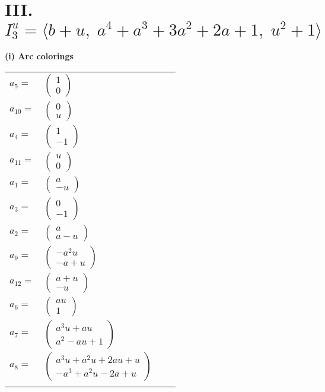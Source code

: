 \documentclass[1p]{elsarticle_modified}
\theoremstyle{definition}
\begin{document}
\centering \section*{III. $I^u_{3}= \langle b+u,\;a^4+a^3+3 a^2+2 a+1,\;u^2+1 \rangle$}
\flushleft \textbf{(i) Arc colorings}\\
\begin{tabular}{m{7pt} m{180pt} m{7pt} m{180pt} }
\flushright $a_{5}=$&$\begin{pmatrix}1\\0\end{pmatrix}$ \\
\flushright $a_{10}=$&$\begin{pmatrix}0\\u\end{pmatrix}$ \\
\flushright $a_{4}=$&$\begin{pmatrix}1\\-1\end{pmatrix}$ \\
\flushright $a_{11}=$&$\begin{pmatrix}u\\0\end{pmatrix}$ \\
\flushright $a_{1}=$&$\begin{pmatrix}a\\- u\end{pmatrix}$ \\
\flushright $a_{3}=$&$\begin{pmatrix}0\\-1\end{pmatrix}$ \\
\flushright $a_{2}=$&$\begin{pmatrix}a\\a- u\end{pmatrix}$ \\
\flushright $a_{9}=$&$\begin{pmatrix}- a^2 u\\- a+u\end{pmatrix}$ \\
\flushright $a_{12}=$&$\begin{pmatrix}a+u\\- u\end{pmatrix}$ \\
\flushright $a_{6}=$&$\begin{pmatrix}a u\\1\end{pmatrix}$ \\
\flushright $a_{7}=$&$\begin{pmatrix}a^3 u+a u\\a^2- a u+1\end{pmatrix}$ \\
\flushright $a_{8}=$&$\begin{pmatrix}a^3 u+a^2 u+2 a u+u\\- a^3+a^2 u-2 a+u\end{pmatrix}$\\&\end{tabular}
\end{document}
